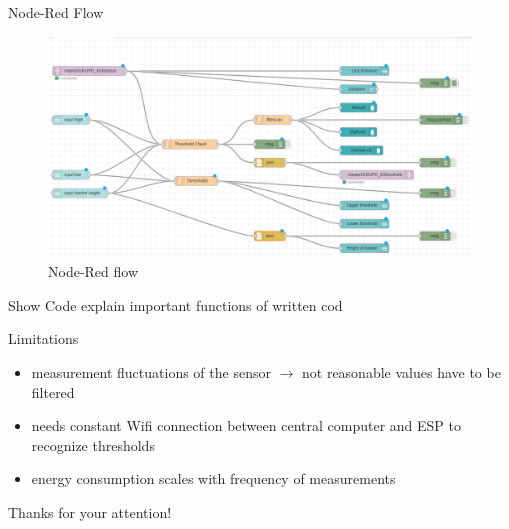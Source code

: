 \documentclass[11pt]{beamer}
\begin{document}
\begin{frame}{Node-Red Flow}
\begin{figure}
\hspace*{-0.6cm}\includegraphics[scale=1.1]{pic/flowScheme.png}
\caption{Node-Red flow}
\label{flow}
\end{figure}
\end{frame}

\begin{frame}{Show Code}
explain important functions of written cod
\end{frame}

\begin{frame}{Limitations}
\begin{itemize}
\item measurement fluctuations of the sensor $\to$ not reasonable values have to be filtered
\item needs constant Wifi connection between central computer and ESP to recognize thresholds
\item energy consumption scales with frequency of measurements
\end{itemize}
\end{frame}

\begin{frame}{}
\center
\huge{Thanks for your attention!}
\end{frame}
\end{document}
